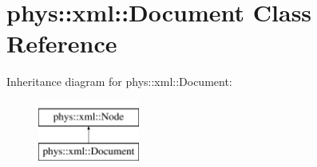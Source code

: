 \hypertarget{classphys_1_1xml_1_1Document}{
\section{phys::xml::Document Class Reference}
\label{dd/d44/classphys_1_1xml_1_1Document}
}
Inheritance diagram for phys::xml::Document:\begin{figure}[H]
\begin{center}
\leavevmode
\includegraphics[height=2.000000cm]{dd/d44/classphys_1_1xml_1_1Document}
\end{center}
\end{figure}

